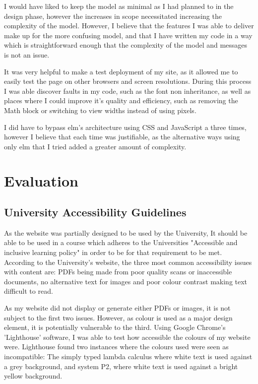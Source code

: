 \documentclass{l4proj}
\begin{document}
I would have liked to keep the model as minimal as I had planned to in the design phase, however the increases in scope necessitated increasing the complexity of the model.  However, I believe that the features I was able to deliver make up for the more confusing model, and that I have written my code in a way which is straightforward enough that the complexity of the model and messages is not an issue.

It was very helpful to make a test deployment of my site, as it allowed me to easily test the page on other browsers and screen resolutions.  During this process I was able discover faults in my code, such as the font non inheritance, as well as places where I could improve it's quality and efficiency, such as removing the Math block or switching to view widths instead of using pixels.

I did have to bypass elm's architecture using CSS and JavaScript a three times, however I believe that each time was justifiable, as the alternative ways using only elm that I tried added a greater amount of complexity.
\chapter{Evaluation} 

\section{University Accessibility Guidelines}

As the website was partially designed to be used by the University, It should be able to be used in a course which adheres to the Universities "Accessible and inclusive learning policy" in order to be for that requirement to be met. According to the University's website, the three most common accessibility issues with content are: PDFs being made from poor quality scans or inaccessible documents, no alternative text for images and poor colour contrast making text difficult to read.

As my website did not display or generate either PDFs or images, it is not subject to the first two issues.  However, as colour is used as a major design element, it is potentially vulnerable to the third.  Using Google Chrome's 'Lighthouse' software, I was able to test how accessible the colours of my website were.  Lighthouse found two instances where the colours used were seen as incompatible: The simply typed lambda calculus where white text is used against a grey background, and system P2, where white text is used against a bright yellow background.
\end{document}
